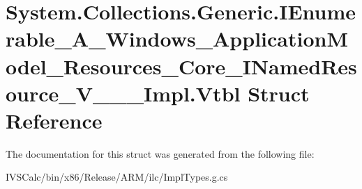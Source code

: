 \hypertarget{struct_system_1_1_collections_1_1_generic_1_1_i_enumerable___a___windows___application_model___r9493f8c9661446a8447e57c55083d8bb}{}\section{System.\+Collections.\+Generic.\+I\+Enumerable\+\_\+\+A\+\_\+\+Windows\+\_\+\+Application\+Model\+\_\+\+Resources\+\_\+\+Core\+\_\+\+I\+Named\+Resource\+\_\+\+V\+\_\+\+\_\+\+\_\+\+Impl.\+Vtbl Struct Reference}
\label{struct_system_1_1_collections_1_1_generic_1_1_i_enumerable___a___windows___application_model___r9493f8c9661446a8447e57c55083d8bb}


The documentation for this struct was generated from the following file\+:\begin{DoxyCompactItemize}
\item 
I\+V\+S\+Calc/bin/x86/\+Release/\+A\+R\+M/ilc/Impl\+Types.\+g.\+cs\end{DoxyCompactItemize}
